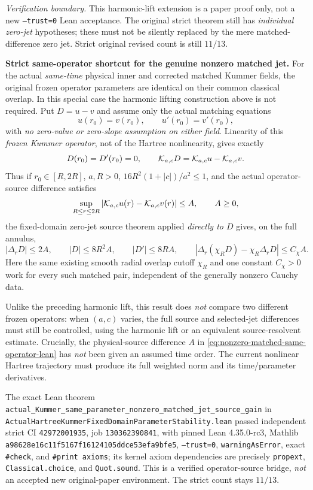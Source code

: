 \noindent\emph{Verification boundary.}
This harmonic-lift extension is a paper proof only, not a new
\texttt{--trust=0} Lean acceptance.  The original strict theorem
still has \emph{individual zero-jet} hypotheses; these must not
be silently replaced by the mere matched-difference zero jet.
Strict original revised count is still $11/13$.


\medskip
\noindent\textbf{Strict same-operator shortcut for the genuine nonzero matched
jet.}
For the actual \emph{same-time} physical inner and corrected matched
Kummer fields, the original frozen operator parameters are identical
on their common classical overlap.  In this special case the harmonic
lifting construction above is not required. Put $D=u-v$ and assume only
the actual matching equations
\[
 u(r_0)=v(r_0),\qquad u'(r_0)=v'(r_0),
\]
with \emph{no zero-value or zero-slope assumption on either field}.
Linearity of this \emph{frozen Kummer operator}, not of the Hartree
nonlinearity, gives exactly
\[
 D(r_0)=D'(r_0)=0,\qquad
 {\cal K}_{a,c}D={\cal K}_{a,c}u-{\cal K}_{a,c}v.
\]
Thus if $r_0\in[R,2R]$, $a,R>0$,
$16R^2(1+|c|)/a^2\le1$, and the actual operator-source
difference satisfies
\[
 \sup_{R\le r\le2R}
   |{\cal K}_{a,c}u(r)-{\cal K}_{a,c}v(r)|\le A,\qquad A\ge0,
\]
the fixed-domain zero-jet source theorem applied \emph{directly to $D$}
gives, on the full annulus,
\begin{equation}
 |\Delta_rD|\le2A,\qquad |D|\le8R^2A,\qquad |D'|\le8RA,
 \qquad
 |\Delta_r(\chi_RD)-\chi_R\Delta_rD|\le C_\chi A.
 \label{eq:nonzero-matched-same-operator-lean}
\end{equation}
Here the same existing smooth radial overlap cutoff $\chi_R$ and one
constant $C_\chi>0$ work for every such matched pair, independent of
the generally nonzero Cauchy data.

Unlike the preceding harmonic lift, this result does \emph{not}
compare two different frozen operators: when $(a,c)$ varies, the full
source and selected-jet differences must still be controlled, using
the harmonic lift or an equivalent source-resolvent estimate.
Crucially, the physical-source difference $A$ in
\eqref{eq:nonzero-matched-same-operator-lean} has \emph{not}
been given an assumed time order. The current nonlinear Hartree
trajectory must produce its full weighted norm and its time/parameter
derivatives.

The exact Lean theorem
\texttt{actual\_Kummer\_same\_parameter\_nonzero\_matched\_jet\_source\_gain}
in
\texttt{ActualHartreeKummerFixedDomainParameterStability.lean}
passed independent strict CI
\texttt{42972001935}, job \texttt{130362390841}, with pinned Lean
4.35.0-rc3, Mathlib
\texttt{a98628e16c11f5167f16124105ddce53efa9bfe5},
\texttt{--trust=0}, \texttt{warningAsError}, exact \texttt{\#check},
and \texttt{\#print axioms}; its kernel axiom dependencies are precisely
\texttt{propext}, \texttt{Classical.choice}, and \texttt{Quot.sound}.
This is a verified operator-source bridge, \emph{not} an
accepted new original-paper environment. The strict count stays $11/13$.
